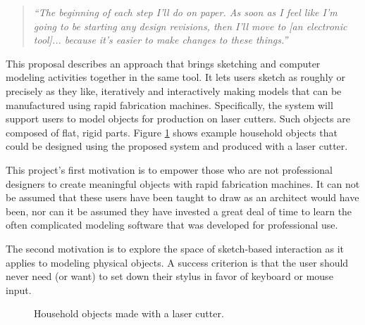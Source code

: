 \documentclass[12pt]{article}
\begin{document}
\begin{quotation}
\textit{``The beginning of each step I'll do on paper. As soon as I feel
  like I'm going to be starting any design revisions, then I'll move
  to [an electronic tool]... because it's easier to make changes to
  these things.''}
\end{quotation}

This proposal describes an approach that brings sketching and computer
modeling activities together in the same tool. It lets users sketch as
roughly or precisely as they like, iteratively and interactively
making models that can be manufactured using rapid fabrication
machines. Specifically, the system will support users to model objects
for production on laser cutters. Such objects are composed of flat,
rigid parts. Figure \ref{fig:flat} shows example household objects
that could be designed using the proposed system and produced with a
laser cutter.

This project's first motivation is to empower those who are not
professional designers to create meaningful objects with rapid
fabrication machines. It can not be assumed that these users have been
taught to draw as an architect would have been, nor can it be assumed
they have invested a great deal of time to learn the often complicated
modeling software that was developed for professional use. 

The second motivation is to explore the space of sketch-based
interaction as it applies to modeling physical objects. A success
criterion is that the user should never need (or want) to set down
their stylus in favor of keyboard or mouse input.

\begin{figure}
\centering 
{}
\hspace{1cm} 
\caption{Household objects made with a laser cutter.}
\label{fig:flat}
\end{figure}
\end{document}

